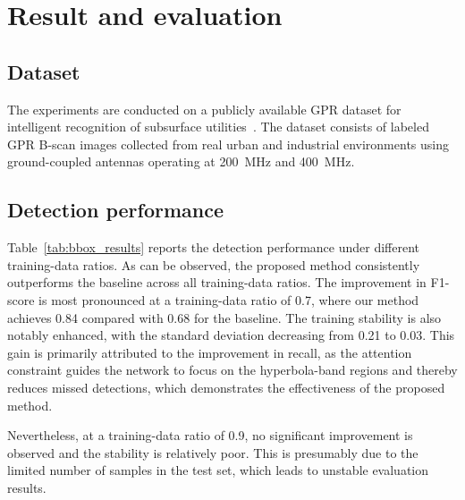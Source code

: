 \documentclass[lettersize,journal]{IEEEtran}
\begin{document}
\section{Result and evaluation}
\subsection{Dataset}
%
The experiments are conducted on a publicly available GPR dataset for intelligent recognition of subsurface utilities~\cite{dataset}.
The dataset consists of labeled GPR B-scan images collected from real urban and industrial environments using ground-coupled antennas operating at 200~MHz and 400~MHz.



\subsection{Detection performance}


Table~\ref{tab:bbox_results} reports the detection performance under different training-data ratios. As can be observed, the proposed method consistently outperforms the baseline across all training-data ratios. The improvement in F1-score is most pronounced at a training-data ratio of 0.7, where our method achieves 0.84 compared with 0.68 for the baseline. The training stability is also notably enhanced, with the standard deviation decreasing from 0.21 to 0.03. This gain is primarily attributed to the improvement in recall, as the attention constraint guides the network to focus on the hyperbola-band regions and thereby reduces missed detections, which demonstrates the effectiveness of the proposed method.

Nevertheless, at a training-data ratio of 0.9, no significant improvement is observed and the stability is relatively poor. This is presumably due to the limited number of samples in the test set, which leads to unstable evaluation results. 
\end{document}
